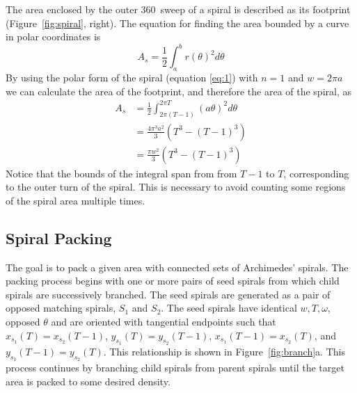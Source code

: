 \documentclass[11pt]{IEEEtran}
\begin{document}
The area enclosed by the outer 360\degree\ sweep of a spiral is described as its footprint (Figure~\ref{fig:spiral}, right). The equation for finding the area bounded by a curve in polar coordinates is 
\begin{equation} \label{eq:4}
	A_{s} = \frac{1}{2} \int_{a}^{b} r(\theta)^2 d\theta
\end{equation}
By using the polar form of the spiral (equation \ref{eq:1}) with $ n = 1 $ and $w = {2 \pi a}$  we can calculate the area of the footprint, and therefore the area of the spiral, as
\begin{equation} 
\label{eq:5} 
\begin{split}
	A_{s} &= \frac{1}{2} \int_{2 \pi (T-1)}^{2 \pi T} (a\theta)^2 d\theta \\
		 &= \frac{4 \pi^3 a^2}{3} (T^3 - (T-1)^3) \\
		 &= \frac{\pi w^2}{3} (T^3 - (T-1)^3) 
\end{split} 
\end{equation}
Notice that the bounds of the integral span from from $ T-1 $ to $ T $, corresponding to the outer turn of the spiral. This is necessary to avoid counting some regions of the spiral area multiple times.

\subsection{Spiral Packing}
\label{spiralpacking}
The goal is to pack a given area with connected sets of Archimedes' spirals. The packing process begins with one or more pairs of seed spirals from which child spirals are successively branched. The seed spirals are generated as a pair of opposed matching spirals, $S_{1}$ and $S_{2}$. The seed spirals have identical $ w, T, \omega $, opposed $\theta$ and are oriented with tangential endpoints such that $ x_{s_{1}}(T) = x_{s_{2}}(T-1) $, 
$ y_{s_{1}}(T) = y_{s_{2}}(T-1)$, 
$ x_{s_{1}}(T-1) = x_{s_{2}}(T)$, and 
$ y_{s_{1}}(T-1) = y_{s_{2}}(T) $. 
This relationship is shown in Figure~\ref{fig:branch}a. This process continues by branching child spirals from parent spirals until the target area is packed to some desired density. 
\end{document}
